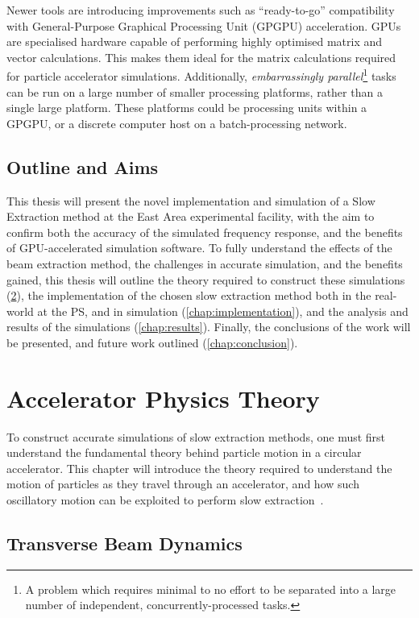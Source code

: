 \documentclass[a4paper,twoside,11pt]{report}
\begin{document}
Newer tools are introducing improvements such as ``ready-to-go'' compatibility with General-Purpose Graphical Processing Unit (GPGPU) acceleration. GPUs are specialised hardware capable of performing highly optimised matrix and vector calculations. This makes them ideal for the matrix calculations required for particle accelerator simulations. Additionally, \textit{embarrassingly parallel}\footnote{A problem which requires minimal to no effort to be separated into a large number of independent, concurrently-processed tasks.} tasks can be run on a large number of smaller processing platforms, rather than a single large platform. These platforms could be processing units within a GPGPU, or a discrete computer host on a batch-processing network.

\section{Outline and Aims}

This thesis will present the novel implementation and simulation of a Slow Extraction method at the East Area experimental facility, with the aim to confirm both the accuracy of the simulated frequency response, and the benefits of GPU-accelerated simulation software. To fully understand the effects of the beam extraction method, the challenges in accurate simulation, and the benefits gained, this thesis will outline the theory required to construct these simulations (\cref{chap:theory}), the implementation of the chosen slow extraction method both in the real-world at the PS, and in simulation (\cref{chap:implementation}), and the analysis and results of the simulations (\cref{chap:results}). Finally, the conclusions of the work will be presented, and future work outlined (\cref{chap:conclusion}).

\chapter{Accelerator Physics Theory}\label{chap:theory}

To construct accurate simulations of slow extraction methods, one must first understand the fundamental theory behind particle motion in a circular accelerator. This chapter will introduce the theory required to understand the motion of particles as they travel through an accelerator, and how such oscillatory motion can be exploited to perform slow extraction~\cite{Wiedemann}.
\section{Transverse Beam Dynamics}\label{sec:theory-transverse}
\end{document}
